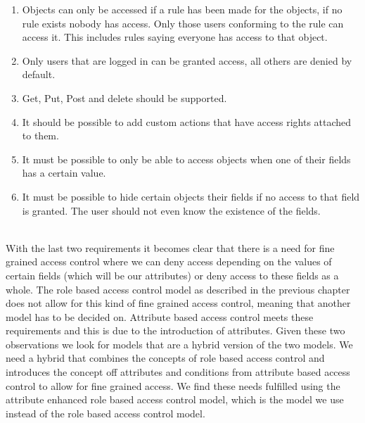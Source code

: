 \begin{enumerate}
    \item Objects can only be accessed if a rule has been made for the objects, if no rule exists nobody has access. Only those users conforming to the rule can access it. This includes rules saying everyone has access to that object.
    \item Only users that are logged in can be granted access, all others are denied by default.
    \item Get, Put, Post and delete should be supported.
    \item It should be possible to add custom actions that have access rights attached to them.
    \item It must be possible to only be able to access objects when one of their fields has a certain value.
    \item It must be possible to hide certain objects their fields if no access to that field is granted. The user should not even know the existence of the fields.
\end{enumerate}
\\
With the last two requirements it becomes clear that there is a need for fine grained access control where we can deny access depending on the values of certain fields (which will be our attributes) or deny access to these fields as a whole.
The role based access control model as described in the previous chapter does not allow for this kind of fine grained access control, meaning that another model has to be decided on.
Attribute based access control meets these requirements and this is due to the introduction of attributes.
Given these two observations we look for models that are a hybrid version of the two models.
We need a hybrid that combines the concepts of role based access control and introduces the concept off attributes and conditions from attribute based access control to allow for fine grained access.
We find these needs fulfilled using the attribute enhanced role based access control model, which is the model we use instead of the role based access control model.

